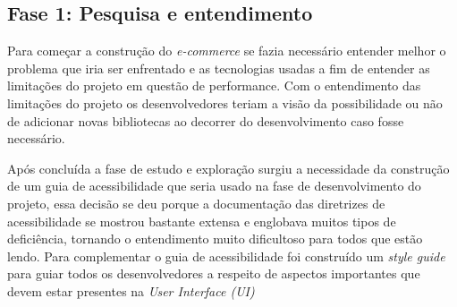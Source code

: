 \subsection{Fase 1: Pesquisa e entendimento}
{Para começar a construção do \textit{e-commerce} se fazia necessário entender melhor o problema que iria ser enfrentado e as tecnologias usadas a fim de entender as limitações do projeto em questão de performance. Com o entendimento das limitações do projeto os desenvolvedores teriam a visão da possibilidade ou não de adicionar novas bibliotecas ao decorrer do desenvolvimento caso fosse necessário. 

Após concluída a fase de estudo e exploração surgiu a necessidade da construção de um guia de acessibilidade que seria usado na fase de desenvolvimento do projeto, essa decisão se deu porque a documentação das diretrizes de acessibilidade se mostrou bastante extensa e englobava muitos tipos de deficiência, tornando o entendimento muito dificultoso para todos que estão lendo. Para complementar o guia de acessibilidade foi construído um \textit{style guide} para guiar todos os desenvolvedores a respeito de aspectos importantes que devem estar presentes na \textit{User Interface (UI)}}

